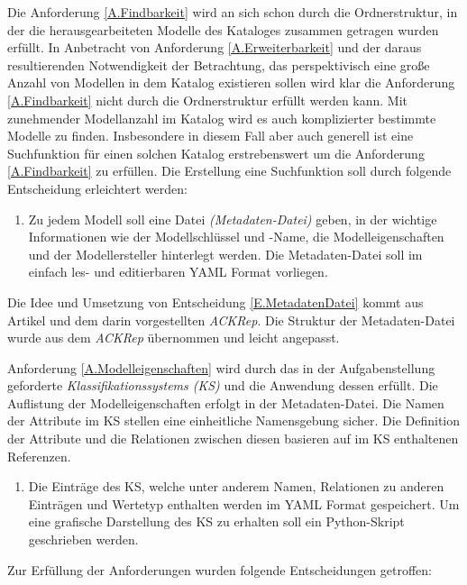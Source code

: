 Die Anforderung \ref{A.Findbarkeit} wird an sich schon durch die Ordnerstruktur, in der die herausgearbeiteten Modelle des Kataloges zusammen getragen wurden erfüllt. In Anbetracht von Anforderung \ref{A.Erweiterbarkeit} und der daraus resultierenden Notwendigkeit der Betrachtung, das perspektivisch eine große Anzahl von Modellen in dem Katalog existieren sollen wird klar die Anforderung \ref{A.Findbarkeit} nicht durch die Ordnerstruktur erfüllt werden kann. Mit zunehmender Modellanzahl im Katalog wird es auch komplizierter bestimmte Modelle zu finden. Insbesondere in diesem Fall aber auch generell ist eine Suchfunktion für einen solchen Katalog erstrebenswert um die Anforderung \ref{A.Findbarkeit} zu erfüllen. Die Erstellung eine Suchfunktion soll durch folgende Entscheidung erleichtert werden:\\
\begin{enumerate}[label=\textbf{Entscheidung E.\arabic*}:, ref=\textbf{E.\arabic*}]
	\item \label{E.MetadatenDatei}Zu jedem Modell soll eine Datei \textit{(Metadaten-Datei)} geben, in der wichtige Informationen wie der Modellschlüssel und -Name, die Modelleigenschaften und der Modellersteller hinterlegt werden. Die Metadaten-Datei soll im einfach les- und editierbaren YAML Format vorliegen.
\end{enumerate}
Die Idee und Umsetzung von Entscheidung \ref{E.MetadatenDatei} kommt aus Artikel \cite{KNHE20} und dem darin vorgestellten \textit{ACKRep}. Die Struktur der Metadaten-Datei wurde aus dem \textit{ACKRep} übernommen und leicht angepasst.

Anforderung \ref{A.Modelleigenschaften} wird durch das in der Aufgabenstellung geforderte \textit{Klassifikationssystems (KS)} und die Anwendung dessen erfüllt. Die Auflistung der Modelleigenschaften erfolgt in der Metadaten-Datei. Die Namen der Attribute im KS stellen eine einheitliche Namensgebung sicher. Die Definition der Attribute und die Relationen zwischen diesen basieren auf im KS enthaltenen Referenzen.\\
\begin{enumerate}[resume*]
	\item Die Einträge des KS, welche unter anderem Namen, Relationen zu anderen Einträgen und Wertetyp enthalten werden im YAML Format gespeichert. Um eine grafische Darstellung des KS zu erhalten soll ein Python-Skript geschrieben werden. 
\end{enumerate}


Zur Erfüllung der Anforderungen wurden folgende Entscheidungen getroffen:\\

